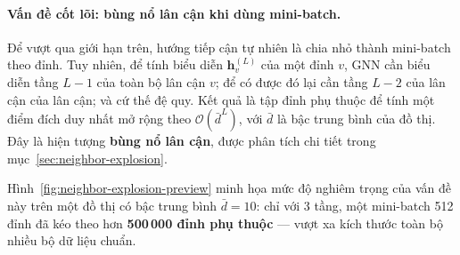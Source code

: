 \paragraph{Vấn đề cốt lõi: bùng nổ lân cận khi dùng mini-batch.}
Để vượt qua giới hạn trên, hướng tiếp cận tự nhiên là chia nhỏ thành mini-batch theo đỉnh. Tuy nhiên, để tính biểu diễn $\mathbf{h}_v^{(L)}$ của một đỉnh $v$, GNN cần biểu diễn tầng $L{-}1$ của toàn bộ lân cận $v$; để có được đó lại cần tầng $L{-}2$ của lân cận của lân cận; và cứ thế đệ quy. Kết quả là tập đỉnh phụ thuộc để tính một điểm đích duy nhất mở rộng theo $\mathcal{O}(\bar{d}^{L})$, với $\bar{d}$ là bậc trung bình của đồ thị. Đây là hiện tượng \textbf{bùng nổ lân cận}, được phân tích chi tiết trong mục~\ref{sec:neighbor-explosion}.

Hình~\ref{fig:neighbor-explosion-preview} minh họa mức độ nghiêm trọng của vấn đề này trên một đồ thị có bậc trung bình $\bar{d}=10$: chỉ với 3 tầng, một mini-batch 512 đỉnh đã kéo theo hơn \textbf{500\,000 đỉnh phụ thuộc} --- vượt xa kích thước toàn bộ nhiều bộ dữ liệu chuẩn.


